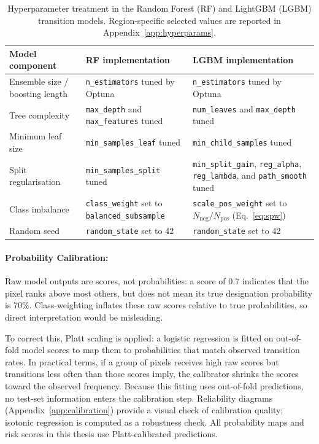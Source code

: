 \documentclass[12pt]{article}
\theoremstyle{break}
\begin{document}
\begin{table}[H]
\centering
\caption{Hyperparameter treatment in the Random Forest (RF) and LightGBM (LGBM)
transition models. Region-specific selected values are reported in
Appendix~\ref{app:hyperparams}.}
\label{tab:hyperparams}
\footnotesize
\begin{tabularx}{\textwidth}{@{}>{\raggedright\arraybackslash}p{}
>{\raggedright\arraybackslash}X
>{\raggedright\arraybackslash}X@{}}
\toprule
\textbf{Model component} & \textbf{RF implementation} & \textbf{LGBM implementation} \\
\midrule
Ensemble size / boosting length
  & \texttt{n\_estimators} tuned by Optuna
  & \texttt{n\_estimators} tuned by Optuna \\
Tree complexity
  & \texttt{max\_depth} and \texttt{max\_features} tuned
  & \texttt{num\_leaves} and \texttt{max\_depth} tuned \\
Minimum leaf size
  & \texttt{min\_samples\_leaf} tuned
  & \texttt{min\_child\_samples} tuned \\
Split regularisation
  & \texttt{min\_samples\_split} tuned
  & \texttt{min\_split\_gain}, \texttt{reg\_alpha}, \texttt{reg\_lambda}, and
    \texttt{path\_smooth} tuned \\
Class imbalance
  & \texttt{class\_weight} set to \texttt{balanced\_subsample}
  & \texttt{scale\_pos\_weight} set to $N_{\text{neg}}/N_{\text{pos}}$
    (Eq.~\ref{eq:spw}) \\
Random seed
  & \texttt{random\_state} set to 42
  & \texttt{random\_state} set to 42 \\
\bottomrule
\end{tabularx}
\end{table}

\paragraph{Probability Calibration:}
\label{sec:calibration}

Raw model outputs are scores, not probabilities: a score of 0.7 indicates that the
pixel ranks above most others, but does not mean its true designation probability is
70\%. Class-weighting inflates these raw scores relative to true probabilities, so
direct interpretation would be misleading.

To correct this, Platt scaling \citep{platt1999, niculescumizil2005} is applied: a
logistic regression is fitted on out-of-fold model scores to map them to probabilities
that match observed transition rates. In practical terms, if a group of pixels receives
high raw scores but transitions less often than those scores imply, the calibrator
shrinks the scores toward the observed frequency. Because this fitting uses
out-of-fold predictions, no test-set information enters the calibration step.
Reliability diagrams (Appendix~\ref{app:calibration}) provide a visual check of
calibration quality; isotonic regression \citep{zadrozny2002} is computed as a
robustness check. All probability maps and risk scores in this thesis use
Platt-calibrated predictions.
\end{document}
